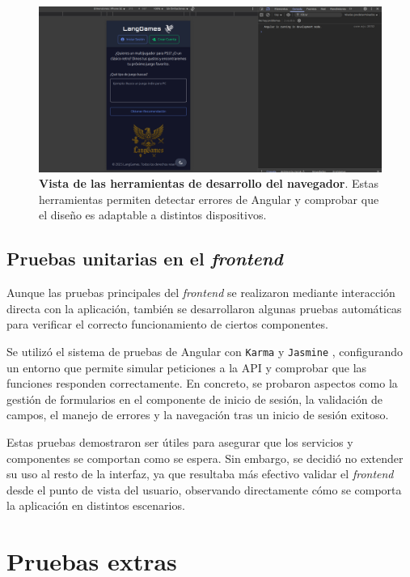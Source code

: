 \begin{figure}[H]
	\centering
	\includegraphics[width=1\linewidth]{imagenes/consolaNavegador.png}
	\caption[\textbf{Vista de las herramientas de desarrollo del navegador}.]{\textbf{Vista de las herramientas de desarrollo del navegador}. Estas herramientas permiten detectar errores de Angular y comprobar que el diseño es adaptable a distintos dispositivos.}
	\label{consola-navegador}
\end{figure}


\subsection{Pruebas unitarias en el \textit{frontend}}

Aunque las pruebas principales del \textit{frontend} se realizaron mediante interacción directa con la aplicación, también se desarrollaron algunas pruebas automáticas para verificar el correcto funcionamiento de ciertos componentes.

Se utilizó el sistema de pruebas de Angular con \texttt{Karma} y \texttt{Jasmine} \cite{green2013angularjs}, configurando un entorno que permite simular peticiones a la API y comprobar que las funciones responden correctamente. En concreto, se probaron aspectos como la gestión de formularios en el componente de inicio de sesión, la validación de campos, el manejo de errores y la navegación tras un inicio de sesión exitoso.

Estas pruebas demostraron ser útiles para asegurar que los servicios y componentes se comportan como se espera. Sin embargo, se decidió no extender su uso al resto de la interfaz, ya que resultaba más efectivo validar el \textit{frontend} desde el punto de vista del usuario, observando directamente cómo se comporta la aplicación en distintos escenarios.


\newpage

\section{Pruebas extras}

